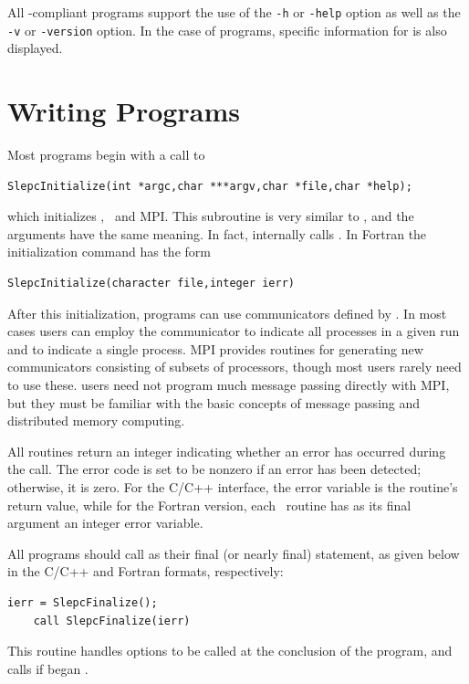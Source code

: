 All \petsc-compliant programs support the use of the \Verb!-h!
or \Verb!-help! option as well as the \Verb!-v! or \Verb!-version! option. In the case of \slepc programs, specific information for \slepc is also displayed.

\section{Writing \slepc Programs}

Most \slepc programs begin with a call to 
	\begin{Verbatim}[fontsize=\small]
	SlepcInitialize(int *argc,char ***argv,char *file,char *help);
	\end{Verbatim}
which initializes \slepc, \petsc\ and MPI. This subroutine is very similar to , and the arguments have the same meaning. In fact, internally  calls .
In Fortran the initialization command has the form
	\begin{Verbatim}[fontsize=\small]
	SlepcInitialize(character file,integer ierr)
	\end{Verbatim}

After this initialization, \slepc programs can use communicators defined by \petsc. In most cases users can employ the communicator  to indicate all processes in a given run and  to indicate a single process. MPI provides routines for generating new communicators consisting of subsets of processors, though most users rarely need to use these. \slepc users need not program much message passing directly
with MPI, but they must be familiar with the basic concepts of message
passing and distributed memory computing.

All \slepc routines return an integer indicating whether an error has
occurred during the call.  The error code is set to be nonzero if an
error has been detected; otherwise, it is zero.  For the C/C++
interface, the error variable is the routine's return value, while for
the Fortran version, each \petsc\ routine has as its final argument an
integer error variable. 

All \slepc programs should call 
as their final (or nearly final) statement, as given below in the C/C++
and Fortran formats, respectively:
	\begin{Verbatim}[fontsize=\small]
	ierr = SlepcFinalize();
	call SlepcFinalize(ierr)
	\end{Verbatim}
This routine handles options to be called at the conclusion of
the program, and calls 
if 
began \petsc.


